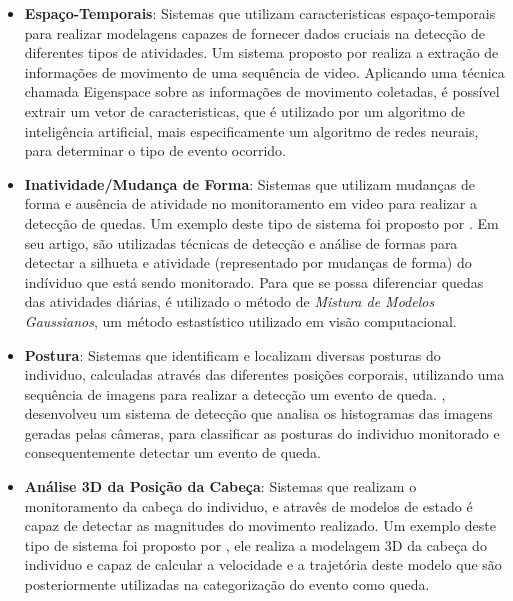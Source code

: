 \begin{itemize}
	\item{\textbf{Espaço-Temporais}: Sistemas que utilizam caracteristicas espaço-temporais para realizar modelagens capazes de fornecer dados cruciais na detecção de diferentes tipos de atividades.  Um sistema proposto por \cite{foroughi2008eigenspace} realiza a extração de informações de movimento de uma sequência de video. Aplicando uma técnica chamada Eigenspace sobre as informações de movimento coletadas, é possível extrair um vetor de caracteristicas, que  é utilizado por um algoritmo de inteligência artificial, mais especificamente um algoritmo de redes neurais, para determinar o tipo de evento ocorrido. }
	
	\item{\textbf{Inatividade/Mudança de Forma}: Sistemas que utilizam mudanças de forma e ausência de atividade no monitoramento em video para realizar a detecção de quedas. Um exemplo deste tipo de sistema foi proposto por \cite{rougier2011robust}. Em seu artigo, são utilizadas técnicas de detecção e análise de formas para detectar a silhueta e atividade (representado por mudanças de forma) do indíviduo que está sendo monitorado. Para que se possa diferenciar quedas das atividades diárias, é utilizado o método de \textit{Mistura de Modelos Gaussianos}, um método estastístico utilizado em visão computacional.}
	
	\item{\textbf{Postura}: Sistemas que identificam e localizam diversas posturas do individuo, calculadas através das diferentes posições corporais, utilizando uma sequência de imagens para realizar a detecção um evento de queda. \cite{cucchiara2005probabilistic}, desenvolveu um sistema de detecção que analisa os histogramas das imagens geradas pelas câmeras, para classificar as posturas do individuo monitorado e consequentemente detectar um evento de queda.  }
	
	\item{\textbf{Análise 3D da Posição da Cabeça}: Sistemas que realizam o monitoramento da cabeça do individuo, e atravês de modelos de estado é capaz de detectar as magnitudes do movimento realizado. Um exemplo deste tipo de sistema foi proposto por \cite{rougier2005demo}, ele realiza a modelagem 3D da cabeça do individuo e capaz de calcular a velocidade e a trajetória deste modelo que são posteriormente utilizadas na categorização do evento como queda.}	
\end{itemize}



